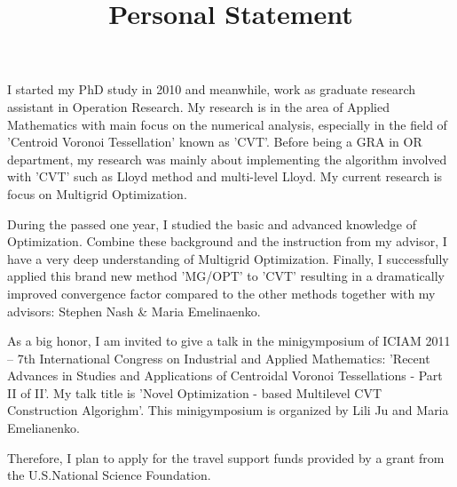 \documentclass[letterpaper]{article}
\title{\bf  Personal Statement}
\begin{document}
I started my PhD study in  2010 and meanwhile, work as graduate research assistant in Operation Research. 
My research is in the area of Applied Mathematics with main focus on the numerical analysis, especially in the field of  'Centroid Voronoi Tessellation' known as 'CVT'. Before being a GRA in OR department, my research was mainly about implementing the algorithm involved with 'CVT' such as Lloyd method and multi-level Lloyd. My current research is focus on Multigrid Optimization. 


During the passed one year,  I studied the basic and advanced knowledge of Optimization. Combine these background and the instruction from my advisor, I have a very deep understanding of Multigrid Optimization. Finally, I successfully applied this brand new method 'MG/OPT'  to  'CVT' resulting in a dramatically improved convergence factor compared to the other methods together with my advisors: Stephen Nash & Maria Emelinaenko.


As a big honor, I am invited to give a talk in the minigymposium of ICIAM 2011 -- 7th International Congress on Industrial and Applied Mathematics: 'Recent Advances in Studies and Applications of Centroidal Voronoi Tessellations - Part II of II'. My talk title is 'Novel Optimization - based Multilevel CVT Construction Algorighm'. This minigymposium is organized by Lili Ju and  Maria Emelianenko. 

Therefore, I plan to apply for the travel support funds provided by a grant from the U.S.National Science Foundation.
\end{document}
